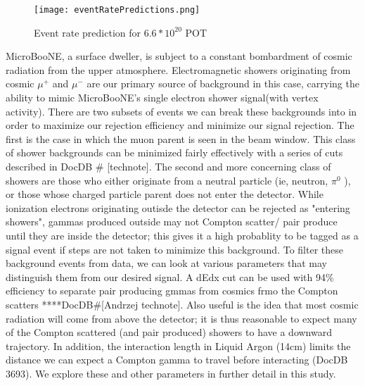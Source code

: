 \documentclass[12pt]{article}
\begin{document}
\begin{figure}[h!]
\centering
\texttt{[image: eventRatePredictions.png]}
\caption{Event rate prediction for $6.6*10^{20}$ POT}
\end{figure}


\par MicroBooNE, a surface dweller, is subject to a constant bombardment of cosmic radiation from the upper atmosphere. Electromagnetic showers originating from cosmic $\mu^+$ and $\mu^-$ are our primary source of background in this case, carrying the ability to mimic MicroBooNE's single electron shower signal(with vertex activity). There are two subsets of events we can break these backgrounds into in order to maximize our rejection efficiency and minimize our signal rejection.  The first is the case in which the muon parent is seen in the beam window. This class of shower backgrounds can be minimized fairly effectively with a series of cuts described in DocDB \# [technote].  The second and more concerning class of showers are those who either originate from a neutral particle (ie, neutron, $\pi^0$ ), or those whose charged particle parent does not enter the detector.  While ionization electrons originating outisde the detector can be rejected as "entering showers", gammas produced outside may not Compton scatter/ pair produce until they are inside the detector; this gives it a high probablity to be tagged as a signal event if steps are not taken to minimize this background. To filter these background events from data, we can look at various parameters that may distinguish them from our desired signal. A dEdx cut can be used with 94\% efficiency to separate pair producing gmmas from cosmics frmo the Compton scatters ****DocDB\#[Andrzej technote]. Also useful is the idea that most cosmic radiation will come from above the detector; it is thus reasonable to expect many of the Compton scattered (and pair produced) showers to have a downward trajectory. In addition, the interaction length in Liquid Argon (14cm) limits the distance we can expect a Compton gamma to travel before interacting (DocDB 3693).   We explore these and other parameters in further detail in this study.
\end{document}
